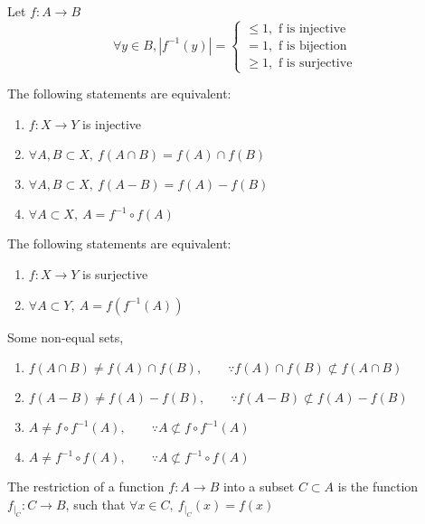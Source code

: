 	\begin{remark} Let $f:A\to B$
		$$\forall y \in B, |f^{-1}(y)| = \begin{cases}
			\leq 1, \text{ f is injective }\\
			= 1, \text{ f is bijection }\\
			\geq 1, \text{ f is surjective}
		\end{cases}$$
	\end{remark}

	\begin{remark}The following statements are equivalent:
		\begin{enumerate}
			\item $f : X \to Y$ is injective
		 	\item $\forall A,B \subset X,\ f(A\cap B) = f(A) \cap f(B)$ 
		 	\item $\forall A,B \subset X,\ f(A-B) = f(A)-f(B)$
		 	\item $\forall A \subset X,\ A = f^{-1}\circ f(A)$
		\end{enumerate}
	\end{remark}

	\begin{remark}The following statements are equivalent:
		\begin{enumerate}
			\item $f : X \to Y$ is surjective
		 	\item $\forall A \subset Y,\ A = f(f^{-1}(A))$
		\end{enumerate}
	\end{remark}

	\begin{remark} Some non-equal sets,
		\begin{enumerate}
			 \item $f(A\cap B) \neq f(A) \cap f(B),\qquad \because f(A) \cap f(B) \not\subset f(A\cap B)$
			 \item $f(A-B) \neq f(A)-f(B),\qquad  \because f(A-B) \not\subset f(A)-f(B)$
			 \item $A \neq f \circ f^{-1}(A),\qquad \because A \not\subset f \circ f^{-1}(A)$
			 \item $A \neq f^{-1} \circ f(A),\qquad \because A \not\subset f^{-1}\circ f(A)$
		\end{enumerate}
	\end{remark}

	\begin{definition}
		The restriction of a function $f:A \to B$ into a subset $C \subset A$ is the function $f_{|_C} : C \to B$, such that $\forall x \in C,\ f_{|_C}(x) = f(x)$
	\end{definition}

